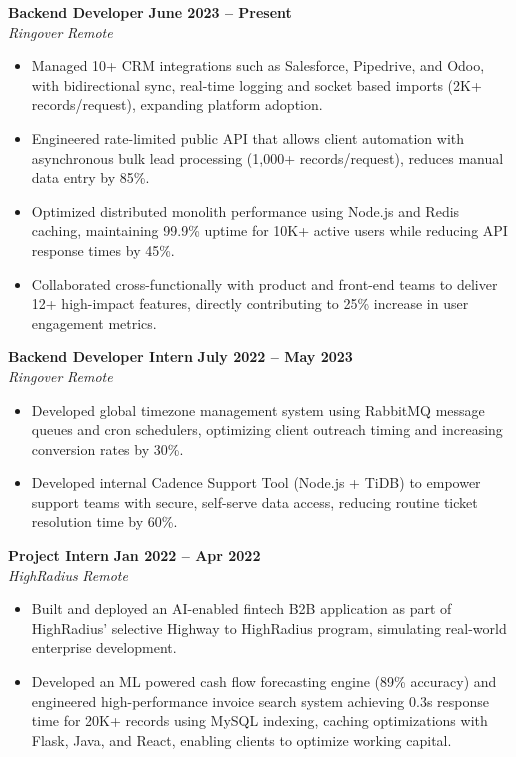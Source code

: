 \documentclass[a4paper,12pt]{article}
\newenvironment{experience}[4]
{%
    \noindent\textbf{#1} \hfill \textbf{#2} \\
    \textit{#3} \hfill \textit{#4} 
    \begin{itemize}[nosep, leftmargin=1.2em, itemsep=1pt, label=$\bullet$]
}
{%
    \end{itemize}
}
\begin{document}
\begin{experience}
 {Backend Developer}                        %
  {June 2023 -- Present}                    %
  {Ringover}                               %
  {Remote}                                 %
    \item Managed 10+ CRM integrations such as Salesforce, Pipedrive, and Odoo, with bidirectional sync, real-time logging and socket based imports (2K+ records/request), expanding platform adoption.
    \item Engineered rate-limited public API that allows client automation with asynchronous bulk lead processing (1,000+ records/request), reduces manual data entry by 85\%.  
    \item Optimized distributed monolith performance using Node.js and Redis caching, maintaining 99.9\% uptime for 10K+ active users while reducing API response times by 45\%.
    \item Collaborated cross-functionally with product and front-end teams to deliver 12+ high-impact features, directly contributing to 25\% increase in user engagement metrics.
\end{experience}

\begin{experience}
  {Backend Developer Intern}               %
  {July 2022 -- May 2023}                  %
  {Ringover}                               %
  {Remote}                                 %
   \item Developed global timezone management system using RabbitMQ message queues and cron schedulers, optimizing client outreach timing and increasing conversion rates by 30\%.
    \item Developed internal Cadence Support Tool (Node.js + TiDB) to empower support teams with secure, self-serve data access, reducing routine ticket resolution time by 60\%. 
\end{experience}

\begin{experience}
  {Project Intern}                        %
  {Jan 2022 -- Apr 2022}                  %
  {HighRadius}                            %
  {Remote}                                %
    \item Built and deployed an AI-enabled fintech B2B application as part of HighRadius’ selective Highway to HighRadius program, simulating real-world enterprise development.
    \item Developed an ML powered cash flow forecasting engine (89\% accuracy) and engineered high-performance invoice search system achieving 0.3s response time for 20K+ records using MySQL indexing, caching optimizations with Flask, Java, and React, enabling clients to optimize working capital.
\end{experience}
  
\end{document}
